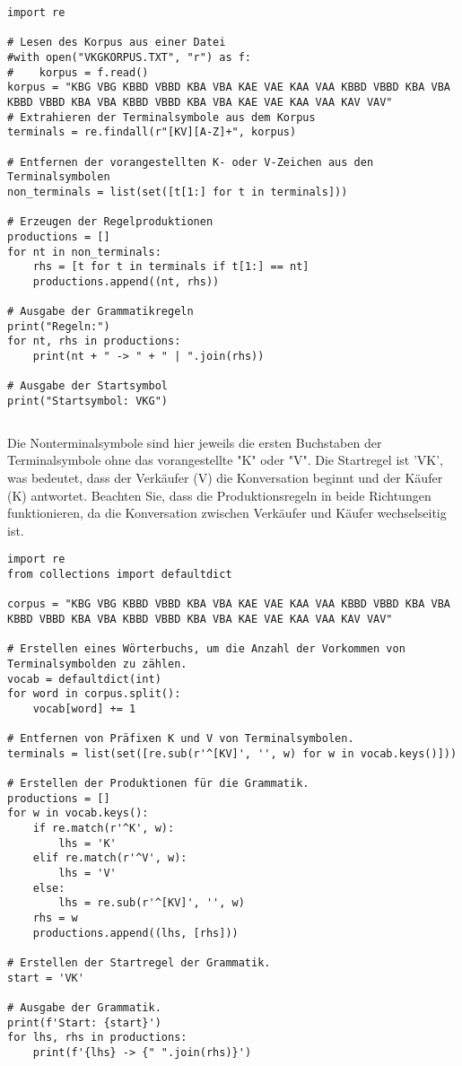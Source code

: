 \documentclass[12pt]{article}
\begin{document}
\begin{verbatim}
import re

# Lesen des Korpus aus einer Datei
#with open("VKGKORPUS.TXT", "r") as f:
#    korpus = f.read()
korpus = "KBG VBG KBBD VBBD KBA VBA KAE VAE KAA VAA KBBD VBBD KBA VBA KBBD VBBD KBA VBA KBBD VBBD KBA VBA KAE VAE KAA VAA KAV VAV"
# Extrahieren der Terminalsymbole aus dem Korpus
terminals = re.findall(r"[KV][A-Z]+", korpus)

# Entfernen der vorangestellten K- oder V-Zeichen aus den Terminalsymbolen
non_terminals = list(set([t[1:] for t in terminals]))

# Erzeugen der Regelproduktionen
productions = []
for nt in non_terminals:
    rhs = [t for t in terminals if t[1:] == nt]
    productions.append((nt, rhs))

# Ausgabe der Grammatikregeln
print("Regeln:")
for nt, rhs in productions:
    print(nt + " -> " + " | ".join(rhs))

# Ausgabe der Startsymbol
print("Startsymbol: VKG")
\end{verbatim}

\begin{verbatim}

\end{verbatim}

Die Nonterminalsymbole sind hier jeweils die ersten Buchstaben der Terminalsymbole ohne das vorangestellte "K" oder "V". Die Startregel ist 'VK', was bedeutet, dass der Verkäufer (V) die Konversation beginnt und der Käufer (K) antwortet. Beachten Sie, dass die Produktionsregeln in beide Richtungen funktionieren, da die Konversation zwischen Verkäufer und Käufer wechselseitig ist.

\begin{verbatim}
import re
from collections import defaultdict

corpus = "KBG VBG KBBD VBBD KBA VBA KAE VAE KAA VAA KBBD VBBD KBA VBA KBBD VBBD KBA VBA KBBD VBBD KBA VBA KAE VAE KAA VAA KAV VAV"

# Erstellen eines Wörterbuchs, um die Anzahl der Vorkommen von Terminalsymbolden zu zählen.
vocab = defaultdict(int)
for word in corpus.split():
    vocab[word] += 1

# Entfernen von Präfixen K und V von Terminalsymbolen.
terminals = list(set([re.sub(r'^[KV]', '', w) for w in vocab.keys()]))

# Erstellen der Produktionen für die Grammatik.
productions = []
for w in vocab.keys():
    if re.match(r'^K', w):
        lhs = 'K'
    elif re.match(r'^V', w):
        lhs = 'V'
    else:
        lhs = re.sub(r'^[KV]', '', w)
    rhs = w
    productions.append((lhs, [rhs]))

# Erstellen der Startregel der Grammatik.
start = 'VK'

# Ausgabe der Grammatik.
print(f'Start: {start}')
for lhs, rhs in productions:
    print(f'{lhs} -> {" ".join(rhs)}')

\end{verbatim}
\end{document}
